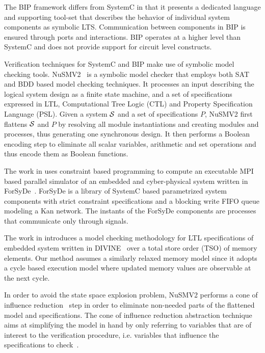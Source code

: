 The BIP framework differs from SystemC in that it presents a dedicated language and supporting
tool-set that describes the behavior of individual system components as symbolic LTS. 
Communication between components in BIP is ensured through ports and interactions.   
BIP operates at a higher level than SystemC and does not provide support for circuit level 
constructs.

Verification techniques for SystemC and BIP make use of symbolic model checking tools. 
NuSMV2~\cite{nusmv} is a symbolic model checker that employs both 
SAT and BDD based model checking techniques. It processes an input 
describing the logical system design as a finite state machine, and a set of specifications
expressed in LTL, Computational Tree Logic (CTL) and Property Specification Language (PSL).
Given a system $\mathcal{S}$ and a set of specifications $P$, NuSMV2 first flattens $\mathcal{S}$ and $P$ by 
resolving all module instantiations and creating modules and processes, thus generating one 
synchronous design. It then performs a Boolean encoding step to eliminate all scalar variables, 
arithmetic and set operations and thus encode them as Boolean functions.   

The work in \cite{NiakiDATAS13} uses constraint based
programming to compute an executable 
MPI based parallel simulator of an embedded and cyber-physical 
system written in ForSyDe~\cite{SanderJ04}.
ForSyDe is a library of SystemC based 
parametrized system components with strict constraint 
specifications and a blocking write FIFO queue modeling 
a Kan network. 
The instants of the ForSyDe components are processes that 
communicate only through signals. 

The work in \cite{BarnatVMCAI2013} introduces a model checking
methodology for LTL specifications of embedded system written 
in DIVINE~\cite{Divine}  over
a total store order (TSO) of memory elements. 
Our method assumes a similarly relaxed memory model
since it adopts a cycle based execution model where 
updated memory values are observable at the next cycle. 

In order to avoid the state space explosion problem, NuSMV2 performs a cone of 
influence reduction~\cite{berezin1998compositional} step in order to eliminate
non-needed parts of the flattened model and specifications. The cone of influence
reduction abstraction technique aims at simplifying the model in hand by only 
referring to variables that are of interest to the verification procedure, i.e. variables
that influence the specifications to check~\cite{clarke1999model}.


